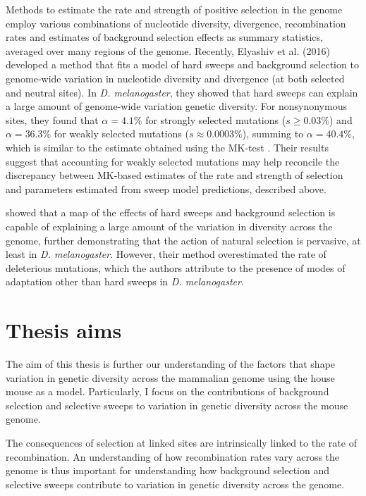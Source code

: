 	Methods to estimate the rate and strength of positive selection in the genome employ various combinations of nucleotide diversity, divergence, recombination rates and estimates of background selection effects as summary statistics, averaged over many regions of the genome. Recently, Elyashiv et al. (2016) developed a method that fits a model of hard sweeps and background selection to genome-wide variation in nucleotide diversity and divergence (at both selected and neutral sites). In \textit{D. melanogaster}, they showed that hard sweeps can explain a large amount of genome-wide variation genetic diversity. For nonsynonymous sites, they found that $\alpha = 4.1\%$ for strongly selected mutations ($s \geq 0.03\%$) and $\alpha = 36.3\%$ for weakly selected mutations ($s \approx 0.0003\%$), summing to $\alpha = 40.4\%$, which is similar to the estimate obtained using the MK-test \citep{RN283}. Their results suggest that accounting for weakly selected mutations may help reconcile the discrepancy between MK-based estimates of the rate and strength of selection and parameters estimated from sweep model predictions, described above.

\cite{RN274} showed that a map of the effects of hard sweeps and background selection is capable of explaining a large amount of the variation in diversity across the genome, further demonstrating that the action of natural selection is pervasive, at least in \textit{D. melanogaster}. However, their method overestimated the rate of deleterious mutations, which the authors attribute to the presence of modes of adaptation other than hard sweeps in \textit{D. melanogaster}. 


\section[Thesis aims]{Thesis aims}

	The aim of this thesis is further our understanding of the factors that shape variation in genetic diversity across the mammalian genome using the house mouse as a model. Particularly, I focus on the contributions of background selection and selective sweeps to variation in genetic diversity across the mouse genome. 

	The consequences of selection at linked sites are intrinsically linked to the rate of recombination. An understanding of how recombination rates vary across the genome is thus important for understanding how background selection and selective sweeps contribute to variation in genetic diversity across the genome.

